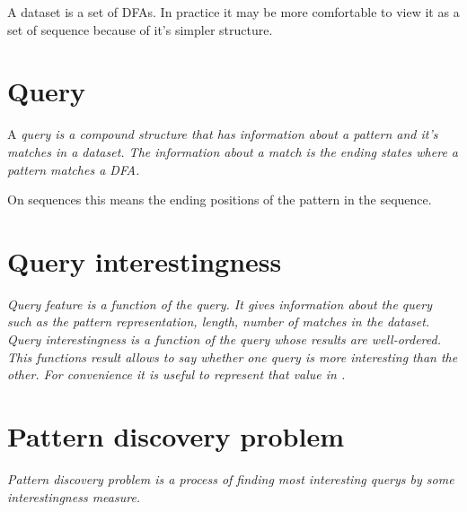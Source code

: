 A dataset is a set of DFAs. In practice it may be more comfortable
to view it as a set of sequence because of it's simpler structure.

\section{Query}

A \em{query} is a compound structure that has information about a
pattern and it's matches in a dataset. The information about a
match is the ending states where a pattern matches a DFA.

On sequences this means the ending positions of the pattern 
in the sequence.

\section{Query interestingness}

\em{Query feature} is a function of the query. It gives 
information about the query such as the pattern representation, 
length, number of matches in the dataset.
\em{Query interestingness} is a function of the query whose
results are well-ordered. This functions result allows to
say whether one query is more interesting than the other.
For convenience it is useful to represent that value in
\Real.

\section{Pattern discovery problem}

\em{Pattern discovery problem} is a process of finding
most interesting querys by some interestingness measure.

